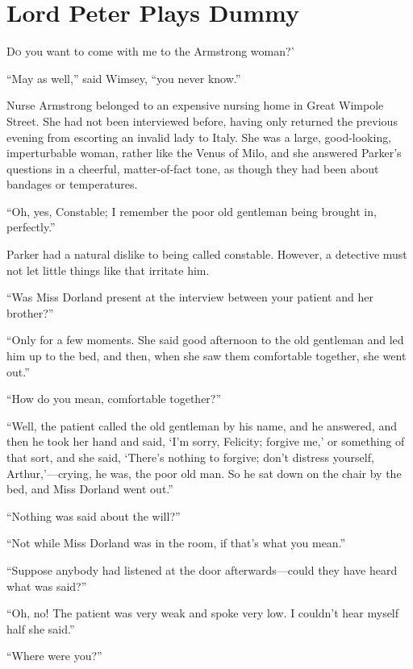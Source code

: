\chapter{Lord Peter Plays Dummy}
\lettrine[lines=4,ante=‘]{D}{o} you want to come with me to the Armstrong woman?'

\zz
\enquote{May as well,} said Wimsey, \enquote{you never know.}

\zz
Nurse Armstrong belonged to an expensive nursing home in Great Wimpole Street. She had not been interviewed before, having only returned the previous evening from escorting an invalid lady to Italy. She was a large, good-looking, imperturbable woman, rather like the Venus of Milo, and she answered Parker's questions in a cheerful, matter-of-fact tone, as though they had been about bandages or temperatures.

\enquote{Oh, yes, Constable; I remember the poor old gentleman being brought in, perfectly.}

Parker had a natural dislike to being called constable. However, a detective must not let little things like that irritate him.

\enquote{Was Miss Dorland present at the interview between your patient and her brother?}

\enquote{Only for a few moments. She said good afternoon to the old gentleman and led him up to the bed, and then, when she saw them comfortable together, she went out.}

\enquote{How do you mean, comfortable together?}

\enquote{Well, the patient called the old gentleman by his name, and he answered, and then he took her hand and said, \enquote{I'm sorry, Felicity; forgive me,} or something of that sort, and she said, \enquote{There's nothing to forgive; don't distress yourself, Arthur,}---crying, he was, the poor old man. So he sat down on the chair by the bed, and Miss Dorland went out.}

\enquote{Nothing was said about the will?}

\enquote{Not while Miss Dorland was in the room, if that's what you mean.}

\enquote{Suppose anybody had listened at the door afterwards\allowbreak---\allowbreak could they have heard what was said?}

\enquote{Oh, no! The patient was very weak and spoke very low. I couldn't hear myself half she said.}

\enquote{Where were you?}

